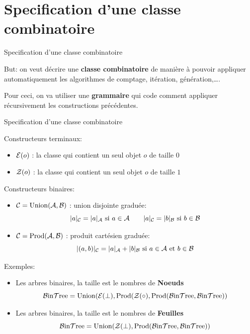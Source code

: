 \documentclass{beamer}
\begin{document}
\section{Specification d'une classe combinatoire}
\begin{frame}{Specification d'une classe combinatoire}

  But: on veut décrire une \textbf{classe combinatoire} de manière à pouvoir
  appliquer automatiquement les algorithmes de comptage, itération,
  génération,\dots.
  \bigskip

  Pour ceci, on va utiliser une \textbf{grammaire} qui code comment appliquer
  récursivement les constructions précédentes.
\end{frame}

\begin{frame}{Specification d'une classe combinatoire}
\begin{NOTE}
  Constructeurs terminaux:
  \begin{itemize}
  \item $\mathcal{E}(o)$ : la classe qui contient un seul objet $o$ de taille $0$
  \item $\mathcal{Z}(o)$ : la classe qui contient un seul objet $o$ de taille $1$
  \end{itemize}
  Constructeurs binaires:
  \begin{itemize}
  \item $\mathcal{C} = \operatorname{Union}(\mathcal{A}, \mathcal{B})$ : union disjointe graduée:
    \[|a|_\mC = |a|_\mA\ \text{si $a\in\mA$}\qquad
      |a|_\mC = |b|_\mB\ \text{si $b\in\mB$}\]
  \item $\mathcal{C} = \operatorname{Prod}(\mathcal{A}, \mathcal{B})$ : produit cartésien graduée:
    \[|(a, b)|_{\mathcal{C}} = |a|_{\mathcal{A}} + |b|_{\mathcal{B}}\ \text{si $a\in\mathcal{A}$ et $b\in\mathcal{B}$}\]
  \end{itemize}
\end{NOTE}
\end{frame}

\begin{frame}{Exemples:}

  \begin{itemize}
  \item Les arbres binaires, la taille est le nombres de \textbf{Noeuds}
    \[
    \operatorname{\mathcal{B}in\mathcal{T}ree} = \operatorname{Union}(\mathcal{E}(\bot), \operatorname{Prod}(\mathcal{Z}(\circ), \operatorname{Prod}(\operatorname{\mathcal{B}in\mathcal{T}ree}, \operatorname{\mathcal{B}in\mathcal{T}ree}))
    \]
  \item Les arbres binaires, la taille est le nombres de \textbf{Feuilles}
    \[
    \operatorname{\mathcal{B}in\mathcal{T}ree} = \operatorname{Union}(\mathcal{Z}(\bot), \operatorname{Prod}(\operatorname{\mathcal{B}in\mathcal{T}ree}, \operatorname{\mathcal{B}in\mathcal{T}ree}))
    \]
  \end{itemize}
\end{frame}
\end{document}
